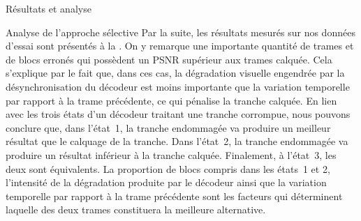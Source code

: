 \begin{chapter}{Résultats et analyse}
\begin{section}{Analyse de l'approche sélective}
Par la suite, les résultats mesurés sur nos données d'essai sont présentés à la
. On y remarque une importante quantité de trames et de
blocs erronés qui possèdent un PSNR supérieur aux trames calquée. Cela
s'explique par le fait que, dans ces cas, la dégradation visuelle engendrée par
la désynchronisation du décodeur est moins importante que la variation
temporelle par rapport à la trame précédente, ce qui pénalise la tranche
calquée. En lien avec les trois états d'un décodeur traitant une tranche
corrompue, nous pouvons conclure que, dans l'état~1, la tranche endommagée va
produire un meilleur résultat que le calquage de la tranche. Dans l'état~2, la
tranche endommagée va produire un résultat inférieur à la tranche calquée.
Finalement, à l'état~3, les deux sont équivalents. La proportion de blocs
compris dans les états~1 et 2, l'intensité de la dégradation produite par le
décodeur ainsi que la variation temporelle par rapport à la trame précédente
sont les facteurs qui déterminent laquelle des deux trames constituera la
meilleure alternative.


\end{section}
\end{chapter}
